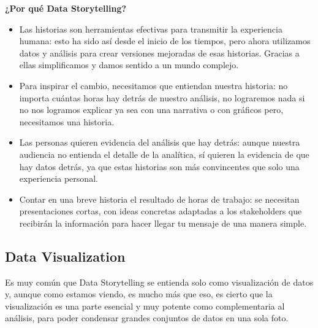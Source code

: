 \documentclass[preprint,12pt]{elsarticle}
\begin{document}
	\textbf{¿Por qué Data Storytelling?}

	\begin{itemize}
		\item Las historias son herramientas efectivas para transmitir la experiencia humana: esto ha sido así desde el inicio de los tiempos, pero ahora utilizamos datos y análisis para crear versiones mejoradas de esas historias. Gracias a ellas simplificamos y damos sentido a un mundo complejo.
		\item Para inspirar el cambio, necesitamos que entiendan nuestra historia: no importa cuántas horas hay detrás de nuestro análisis, no lograremos nada si no nos logramos explicar ya sea con una narrativa o con gráficos pero, necesitamos una historia.

		\item Las personas quieren evidencia del análisis que hay detrás: aunque nuestra audiencia no entienda el detalle de la analítica, sí quieren la evidencia de que hay datos detrás, ya que estas historias son más convincentes que solo una experiencia personal.

		\item Contar en una breve historia el resultado de horas de trabajo: se necesitan presentaciones cortas, con ideas concretas adaptadas a los stakeholders que recibirán la información para hacer llegar tu mensaje de una manera simple. 	
	\end{itemize}

	\subsection{Data Visualization}
	Es muy común que Data Storytelling se entienda solo como visualización de datos y, aunque como estamos viendo, es mucho más que eso, es cierto que la visualización es una parte esencial y muy potente como complementaria al análisis, para poder condensar grandes conjuntos de datos en una sola foto.\\
	
\end{document}
